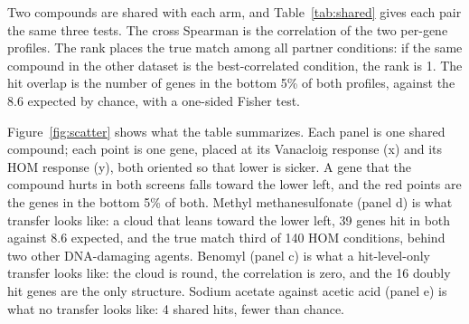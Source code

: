 Two compounds are shared with each arm, and Table~\ref{tab:shared} gives each pair the
same three tests. The cross Spearman is the correlation of the two per-gene profiles.
The rank places the true match among all partner conditions: if the same compound in
the other dataset is the best-correlated condition, the rank is 1. The hit overlap is
the number of genes in the bottom 5\% of both profiles, against the 8.6 expected by
chance, with a one-sided Fisher test.

\begin{table}[htbp]
\centering
\footnotesize
\caption{Transfer of every compound both datasets dose, plus the sodium acetate versus
acetic acid near-pair, which the graph does not join and which serves as the negative
control. Rank is the position of the true match among all partner conditions by cross
Spearman; hits is the overlap of bottom-5\% genes with the chance expectation in
parentheses.}
\label{tab:shared}

\end{table}

Figure~\ref{fig:scatter} shows what the table summarizes. Each panel is one shared
compound; each point is one gene, placed at its Vanacloig response (x) and its HOM
response (y), both oriented so that lower is sicker. A gene that the compound hurts in
both screens falls toward the lower left, and the red points are the genes in the
bottom 5\% of both. Methyl methanesulfonate (panel d) is what transfer looks like: a
cloud that leans toward the lower left, 39 genes hit in both against 8.6 expected, and
the true match third of 140 HOM conditions, behind two other DNA-damaging agents.
Benomyl (panel c) is what a hit-level-only transfer looks like: the cloud is round, the
correlation is zero, and the 16 doubly hit genes are the only structure. Sodium acetate
against acetic acid (panel e) is what no transfer looks like: 4 shared hits, fewer than
chance.


